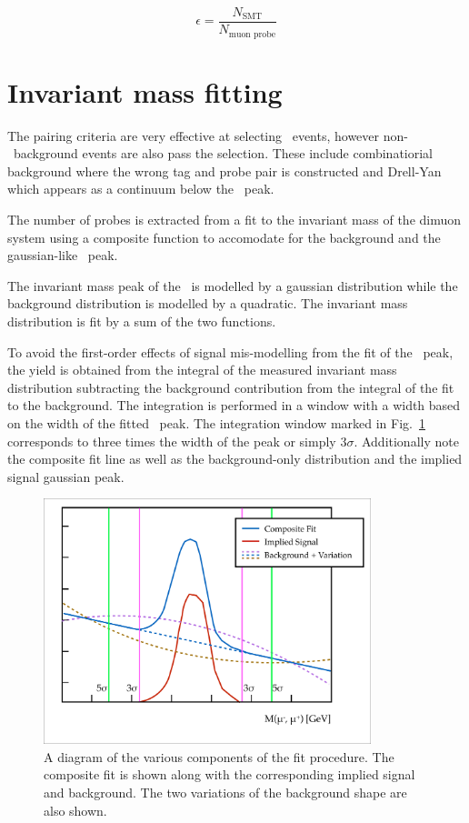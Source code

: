 \begin{equation*}
  \epsilon = \frac{N_{\textrm{SMT}}}{N_{\textrm{muon probe}}}
\end{equation*}

\section{Invariant mass fitting} \label{sec:CalibrationFitting}
The pairing criteria are very effective at selecting \jpsi\ events, however non-\jpsi\ background events are also pass the selection. These include combinatiorial background where the wrong tag and probe pair is constructed and Drell-Yan which appears as a continuum below the \jpsi\ peak.

The number of probes is extracted from a fit to the invariant mass of the dimuon system using a composite function to accomodate for the background and the gaussian-like \jpsi\ peak. 

The invariant mass peak of the \jpsi\ is modelled by a gaussian distribution while the background distribution is modelled by a quadratic. The invariant mass distribution is fit by a sum of the two functions.

To avoid the first-order effects of signal mis-modelling from the fit of the \jpsi\ peak, the yield is obtained from the integral of the measured invariant mass distribution subtracting the background contribution from the integral of the fit to the background. The integration is performed in a window with a width based on the width of the fitted \jpsi\ peak. The integration window marked in Fig.~\ref{fig:CalibrationFittingExample} corresponds to three times the width of the peak or simply $3\sigma$. Additionally note the composite fit line as well as the background-only distribution and the implied signal gaussian peak.

\begin{figure}[htbp]
  \centering
  \includegraphics[width=0.85\textwidth]{PartCalibration2012/Plots/FittingExample.pdf}
  \caption{A diagram of the various components of the fit procedure. The composite fit is shown along with the corresponding implied signal and background. The two variations of the background shape are also shown.} \label{fig:CalibrationFittingExample}
\end{figure}

